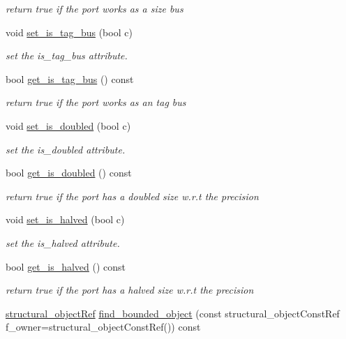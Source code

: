 \begin{DoxyCompactItemize}
\begin{DoxyCompactList}\small\item\em return true if the port works as a size bus \end{DoxyCompactList}\item 
void \hyperlink{structport__o_a6d92dcc21030c37d4a26946fded023e2}{set\+\_\+is\+\_\+tag\+\_\+bus} (bool c)
\begin{DoxyCompactList}\small\item\em set the is\+\_\+tag\+\_\+bus attribute. \end{DoxyCompactList}\item 
bool \hyperlink{structport__o_a721a7b8787a16242efd1fe22478ad8e1}{get\+\_\+is\+\_\+tag\+\_\+bus} () const
\begin{DoxyCompactList}\small\item\em return true if the port works as an tag bus \end{DoxyCompactList}\item 
void \hyperlink{structport__o_a8105ee88db27373d643966b54540cb73}{set\+\_\+is\+\_\+doubled} (bool c)
\begin{DoxyCompactList}\small\item\em set the is\+\_\+doubled attribute. \end{DoxyCompactList}\item 
bool \hyperlink{structport__o_aca824b0fb3a97416a5b3da5d26205608}{get\+\_\+is\+\_\+doubled} () const
\begin{DoxyCompactList}\small\item\em return true if the port has a doubled size w.\+r.\+t the precision \end{DoxyCompactList}\item 
void \hyperlink{structport__o_ac28608897ce69d6686aae9af437ce4b8}{set\+\_\+is\+\_\+halved} (bool c)
\begin{DoxyCompactList}\small\item\em set the is\+\_\+halved attribute. \end{DoxyCompactList}\item 
bool \hyperlink{structport__o_ac7da78390613617e3f1be7b9f583cef9}{get\+\_\+is\+\_\+halved} () const
\begin{DoxyCompactList}\small\item\em return true if the port has a halved size w.\+r.\+t the precision \end{DoxyCompactList}\item 
\hyperlink{structural__objects_8hpp_a8ea5f8cc50ab8f4c31e2751074ff60b2}{structural\+\_\+object\+Ref} \hyperlink{structport__o_afdb4346833a3eac62db21966c7fc65c5}{find\+\_\+bounded\+\_\+object} (const structural\+\_\+object\+Const\+Ref f\+\_\+owner=structural\+\_\+object\+Const\+Ref()) const

\end{DoxyCompactItemize}
